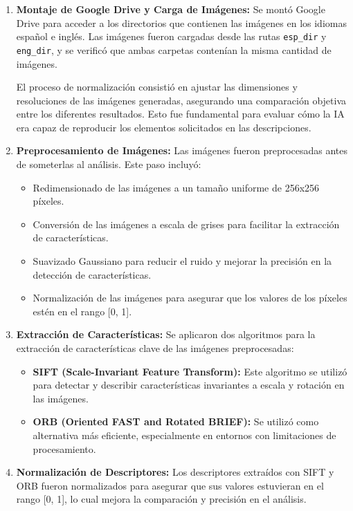 \documentclass[unnumsec,webpdf,modern,large]{mam-authoring-template}
\theoremstyle{thmstyleone}%
\theoremstyle{thmstyletwo}%
\theoremstyle{thmstylethree}%
\begin{document}
\begin{enumerate}
    \item \textbf{Montaje de Google Drive y Carga de Imágenes:} Se montó Google Drive para acceder a los directorios que contienen las imágenes en los idiomas español e inglés. Las imágenes fueron cargadas desde las rutas \texttt{esp\_dir} y \texttt{eng\_dir}, y se verificó que ambas carpetas contenían la misma cantidad de imágenes.

    El proceso de normalización consistió en ajustar las dimensiones y resoluciones de las imágenes generadas, asegurando una comparación objetiva entre los diferentes resultados. Esto fue fundamental para evaluar cómo la IA era capaz de reproducir los elementos solicitados en las descripciones.

    \item \textbf{Preprocesamiento de Imágenes:} Las imágenes fueron preprocesadas antes de someterlas al análisis. Este paso incluyó:
    \begin{itemize}
        \item Redimensionado de las imágenes a un tamaño uniforme de 256x256 píxeles.
        \item Conversión de las imágenes a escala de grises para facilitar la extracción de características.
        \item Suavizado Gaussiano para reducir el ruido y mejorar la precisión en la detección de características.
        \item Normalización de las imágenes para asegurar que los valores de los píxeles estén en el rango [0, 1].
    \end{itemize}

    \item \textbf{Extracción de Características:} Se aplicaron dos algoritmos para la extracción de características clave de las imágenes preprocesadas:
    \begin{itemize}
        \item \textbf{SIFT (Scale-Invariant Feature Transform):} Este algoritmo se utilizó para detectar y describir características invariantes a escala y rotación en las imágenes.
        \item \textbf{ORB (Oriented FAST and Rotated BRIEF):} Se utilizó como alternativa más eficiente, especialmente en entornos con limitaciones de procesamiento.
    \end{itemize}

    \item \textbf{Normalización de Descriptores:} Los descriptores extraídos con SIFT y ORB fueron normalizados para asegurar que sus valores estuvieran en el rango [0, 1], lo cual mejora la comparación y precisión en el análisis.


\end{enumerate}
\end{document}
